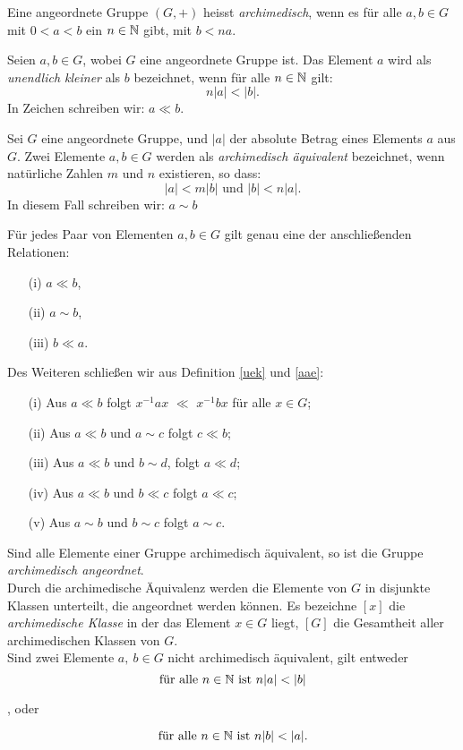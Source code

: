 %
\begin{defn}\label{archim}
Eine angeordnete Gruppe $\left(G,+\right)$ heisst \textit{archimedisch}, wenn es für alle $a, b \in G$  mit $0 < a < b$ ein $n \in \mathbb{N} $ gibt, mit $b < na$.
\end{defn}
%
%
\begin{defn}\label{uek}
Seien $a, b \in G$, wobei $G$ eine angeordnete Gruppe ist. Das Element $a$ wird als \textit{unendlich kleiner} als $b$ bezeichnet, wenn für alle $  n \in \mathbb{N} $ gilt: 
\[n|a| < |b|.\]
In Zeichen schreiben wir: $a \ll b$.
\end{defn}
%
\begin{defn}\label{aae}
Sei $G$ eine angeordnete Gruppe, und $|a|$ der absolute Betrag eines Elements $a$ aus $G$. Zwei Elemente $a,b \in G$ werden als \textit{archimedisch äquivalent} bezeichnet, wenn natürliche Zahlen $m$ und $n$ existieren, so dass: 
\[|a| < m|b| \text{ und } |b| < n|a|.\]
In diesem Fall schreiben wir: $ a \sim b $ 
\end{defn}
%
\begin{folg}
Für jedes Paar von Elementen $a, b \in G$ gilt genau eine der anschließenden Relationen: 
\begin{multicols}{3}
\begin{enumerate}
\item[(i)] $a \ll b$, 
\item[(ii)] $a \sim b$,
\item[(iii)] $b \ll a$. 
\end{enumerate}
\end{multicols}
%
Des Weiteren schließen wir aus Definition \ref{uek} und \ref{aae}:
\begin{enumerate}
\item[(i)] Aus $a \ll b$ folgt $x^{-1}ax $ $\ll$ $x^{-1}bx$ für alle $x \in G$;
\item[(ii)] Aus $a \ll b$ und $a \sim c$ folgt $c \ll b$;
\item[(iii)] Aus $a \ll b$ und $b \sim d$, folgt $a \ll d$;
\item[(iv)] Aus $a \ll b$ und $b \ll c$ folgt $a \ll c$;
\item[(v)] Aus $a \sim b$ und $b \sim c$ folgt $a \sim c$.
\end{enumerate}
Sind alle Elemente einer Gruppe archimedisch äquivalent, so ist die Gruppe \textit{archimedisch angeordnet}. \\ 
Durch die archimedische Äquivalenz werden die Elemente von $G$ in disjunkte Klassen unterteilt, die angeordnet werden können. Es bezeichne $[x]$ die \textit{archimedische Klasse} in der das Element $x \in G$ liegt, $[G]$ die Gesamtheit aller archimedischen Klassen von $G$. \label{archimedischeKlassen}\\
Sind zwei Elemente $a,~b \in G$ nicht archimedisch äquivalent, gilt entweder
\[\text{für alle } n \in \N \text{ ist } n|a|<|b|\]
\centerline{, oder}
\[\text{für alle } n \in \N \text{ ist } n|b| <|a|.\]
\end{folg}
